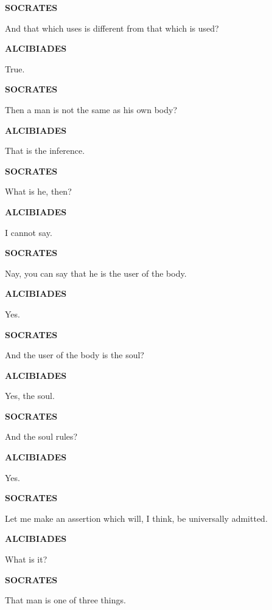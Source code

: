 \documentclass[11pt,letter]{article}
\begin{document}
\par \textbf{SOCRATES}
\par   And that which uses is different from that which is used?

\par \textbf{ALCIBIADES}
\par   True.

\par \textbf{SOCRATES}
\par   Then a man is not the same as his own body?

\par \textbf{ALCIBIADES}
\par   That is the inference.

\par \textbf{SOCRATES}
\par   What is he, then?

\par \textbf{ALCIBIADES}
\par   I cannot say.

\par \textbf{SOCRATES}
\par   Nay, you can say that he is the user of the body.

\par \textbf{ALCIBIADES}
\par   Yes.

\par \textbf{SOCRATES}
\par   And the user of the body is the soul?

\par \textbf{ALCIBIADES}
\par   Yes, the soul.

\par \textbf{SOCRATES}
\par   And the soul rules?

\par \textbf{ALCIBIADES}
\par   Yes.

\par \textbf{SOCRATES}
\par   Let me make an assertion which will, I think, be universally admitted.

\par \textbf{ALCIBIADES}
\par   What is it?

\par \textbf{SOCRATES}
\par   That man is one of three things.
\end{document}

